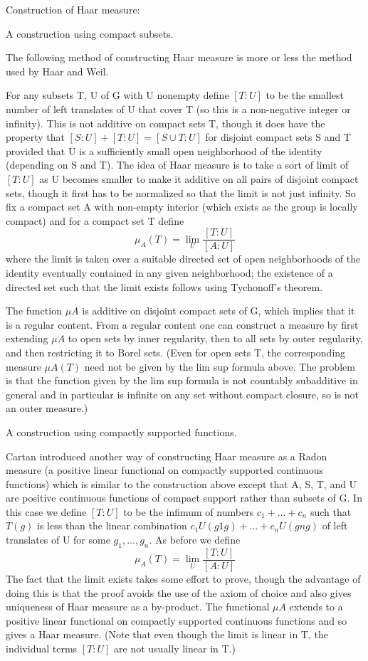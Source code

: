 \documentclass[oneside,12pt]{memoir}
\begin{document}
Construction of Haar measure:

A construction using compact subsets.

The following method of constructing Haar measure is more or less the method used by Haar and Weil.

For any subsets T, U of G with U nonempty define $[T:U]$ to be the smallest number of left translates of U that cover T (so this is a non-negative integer or infinity). This is not additive on compact sets T, though it does have the property that $[S:U]+[T:U]=[S∪T:U]$ for disjoint compact sets S and T provided that U is a sufficiently small open neighborhood of the identity (depending on S and T). The idea of Haar measure is to take a sort of limit of $[T:U]$ as U becomes smaller to make it additive on all pairs of disjoint compact sets, though it first has to be normalized so that the limit is not just infinity. So fix a compact set A with non-empty interior (which exists as the group is locally compact) and for a compact set T define
\begin{equation*}
\mu_A(T)=\lim_U\frac{[T:U]}{[A:U]}
\end{equation*}
where the limit is taken over a suitable directed set of open neighborhoods of the identity eventually contained in any given neighborhood; the existence of a directed set such that the limit exists follows using Tychonoff's theorem.

The function $\mu A$ is additive on disjoint compact sets of G, which implies that it is a regular content. From a regular content one can construct a measure by first extending $\mu A$ to open sets by inner regularity, then to all sets by outer regularity, and then restricting it to Borel sets. (Even for open sets T, the corresponding measure $\mu A(T)$ need not be given by the lim sup formula above. The problem is that the function given by the lim sup formula is not countably subadditive in general and in particular is infinite on any set without compact closure, so is not an outer measure.)

A construction using compactly supported functions.

Cartan introduced another way of constructing Haar measure as a Radon measure (a positive linear functional on compactly supported continuous functions) which is similar to the construction above except that A, S, T, and U are positive continuous functions of compact support rather than subsets of G. In this case we define $[T:U]$ to be the infimum of numbers $c_1+\ldots+c_n$ such that $T(g)$ is less than the linear combination $c_1U(g1g)+\ldots+c_nU(gng)$ of left translates of U for some $g_1,\ldots,g_n$. As before we define
\begin{equation*}
\mu_A(T)=\lim_U\frac{[T:U]}{[A:U]}
\end{equation*}
The fact that the limit exists takes some effort to prove, though the advantage of doing this is that the proof avoids the use of the axiom of choice and also gives uniqueness of Haar measure as a by-product. The functional $\mu A$ extends to a positive linear functional on compactly supported continuous functions and so gives a Haar measure. (Note that even though the limit is linear in T, the individual terms $[T:U]$ are not usually linear in T.)
\end{document}

